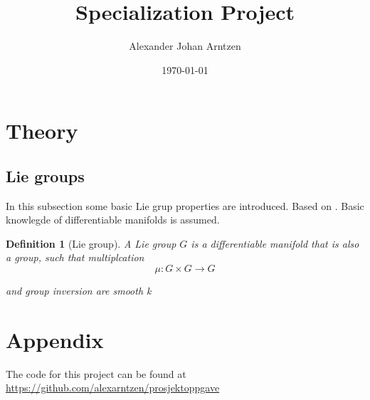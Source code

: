 \documentclass[a4paper]{article}
\title{Specialization Project}
\author{Alexander Johan Arntzen }
\date{\today}
\newtheorem{definition}{Definition}[section]
\begin{document}
\maketitle

\section{Theory}
\subsection{Lie groups}
In this subsection some basic Lie grup properties are introduced. Based on \cite{celledoni2016}. Basic knowlegde of differentiable manifolds is assumed. 
\begin{definition}[Lie group]
  A Lie group $G$ is a differentiable manifold that is also a group, such that multiplcation
  \begin{equation}
    \mu : G \times G \rightarrow G  
  \end{equation}

  
  and group inversion are smooth k
\end{definition}

\cite{lystad2019}

\section*{Appendix}
The code for this project can be found at \url{https://github.com/alexarntzen/prosjektoppgave}


\printbibliography
\end{document}
